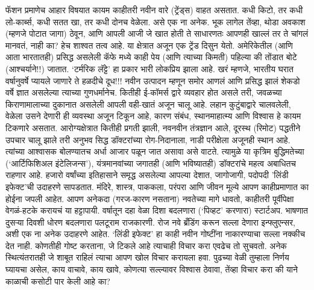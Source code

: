 फॅशन प्रमाणेच आहार विषयात कायम काहीतरी नवीन वारे (ट्रेंड्स) वाहत असतात. कधी किटो, तर कधी लो-कार्ब्स, कधी सतत खा, तर कधी दोनच वेळेला. असे एक ना अनेक. भूक लागेल तेंव्हा, थोडा अवकाश (म्हणजे पोटात जागा) ठेवून, आणि आपली आजी जे खात होती ते साधारणतः आपणही खाल्लं तर ते चांगलं मानवतं, नाही का? हेच शाश्वत तत्व आहे. या क्षेत्रात अजून एक ट्रेंड दिसुन येतो. अमेरिकेतील (आणि आता भारतातही) प्रसिद्ध असलेली कॅफे मध्ये काही पेय (आणि त्याच्या किमती) पहिल्या की तोंडात बोटे (आश्चर्याने!!) जातात. ‘टर्मरिक लॅट्टे’ हा प्रकार भारी लोकप्रिय झाला आहे. खरं म्हणजे, भारतीय घरात वर्षानुवर्षे प्यायले जाणारे ते हळदीचे दूध!!! नवीन उत्पादन म्हणून समोर आणलं आणि प्रसिद्ध झालं शेकडो वर्षे ज्ञात असलेल्या त्याच्या गुणधर्मानेच. 
कितीही ई-कॉमर्स द्वारे व्यवहार होत असले तरी, जवळच्या किराणामालाच्या दुकानात असलेली आपली वही-खातं  अजून चालू आहे. लहान कुटुंबाद्वारे चालवलेली, वेळेला उसने देणारी ही व्यवस्था अजून टिकून आहे, कारण संबंध, स्थानमाहात्म्य आणि विश्वास हे कायम टिकणारे असतात.
आरोग्यक्षेत्रात कितीही प्रगती झाली, नवनवीन तंत्रज्ञान आले, दूरस्थ (रिमोट) पद्धतीने उपचार चालू झाले तरी अनुभव सिद्ध डॉक्टरांच्या रोग-निदानाला, नाडी परीक्षेला अजूनही स्थान आहे. त्यांच्या आश्वासक बोलण्यातच अर्धा आजार पळून जात असावा असे वाटते. त्यामुळे या कृत्रिम बुद्धिमतेच्या (‘आर्टिफिशिअल इंटेलिजन्स’), यंत्रमानवांच्या  जगातही (आणि भविष्यातही) डॉक्टरांचे महत्व अबाधितच राहणार आहे. 
हजारो वर्षांच्या इतिहासाने समृद्ध असलेल्या आपल्या देशात, जागोजागी, पदोपदी 'लिंडी इफेक्ट’ची उदाहरणे सापडतात. मंदिरे, शास्त्र, पाककला, परंपरा आणि जीवन मूल्ये आपण काहीप्रमाणात का होईना जपली आहेत. आपण अनेकदा (गरज-कारण नसताना) नवतेच्या मागे धावतो, काहीतरी पूर्वीपेक्षा वेगळं-हटके करायचं या हट्टापायी. वर्षातून दहा वेळा दिशा बदलणारा (‘पिव्हट’  करणारा) स्टार्टअप. भाषणात दुसऱ्या दिवशी धोरण बदलणारा पलटूराम राजकारणी. रोज नवे ब्रँडिंग करून सल्ला देणारा इन्फ्लुएन्सर, अशी एक ना अनेक उदाहरणे आहेत. 
‘लिंडी इफेक्ट’ हा काही नवीन गोष्टींना नाकारण्याचा सल्ला नक्कीच देत नाही. कोणतीही गोष्ट करताना, जे टिकले आहे त्याचाही विचार करा एवढेच तो सुचवतो. अनेक स्थित्यंतरातही जे शाबूत राहिलं त्याचा आपण खोल विचार करायला हवा. पुढच्या वेळी तुम्हाला निर्णय घ्यायचा असेल,  काय वाचावे, काय खावे, कोणत्या सल्ल्यावर विश्वास ठेवावा, तेंव्हा विचार करा की याने काळाची कसोटी पार केली आहे का?   

